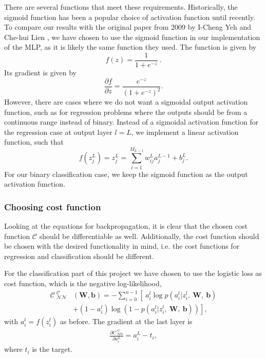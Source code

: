 \documentclass[a4paper, 11pt, twocolumn]{article}
\begin{document}
There are several functions that meet these requirements. Historically, the
sigmoid function has been a popular choice of activation function until recently.
To compare our results with the original paper from 2009 by I-Cheng Yeh and
Che-hui Lien \cite{origarticle}, we have chosen to use the sigmoid function in
our implementation of the MLP, as it is likely the same function they used. The
function is given by
\begin{equation}
	f(z) = \frac{1}{1+e^{-z}}\ .
\end{equation}
Its gradient is given by
\begin{equation}
	\label{eq:df/dz}
	\frac{\partial f}{\partial z} = \frac{e^{-z}}{(1+e^{-z})^2}.
\end{equation}
However, there are cases where we do not want a sigmoidal output activation
function, such as for regression problems where the outputs should be from a
continuous range instead of binary. Instead of a sigmoidal activation function
for the regression case at output layer $l=L$, we implement a linear activation
function, such that
\begin{equation}
f(z_j^L)=z_j^L= \sum_{i=1}^{M_{L-1}} w_{ij}^L a_j^{L-1} + b_j^L.
\end{equation}
For our binary classification case, we keep the sigmoid function as the output
activation function.
\subsubsection{Choosing cost function}
Looking at the equations for backpropagation, it is clear that the chosen cost
function $\mathcal{C}$ should be differentiable as well.
Additionally, the cost function should be chosen with the desired functionality 
in mind, i.e. the cost functions for regression and classification should be different.

For the classification part of this project we have chosen to use the logistic
loss as cost function, which is the negative log-likelihood,
\begin{align}
\mathcal{C_\text{ NN}^\text{ C}}&(\bm{W}, \bm{b}) = -\sum_{i=0}^{n-1}
\left[\  a_i^l\log p\left(a_i^l|z_i^l,\ \bm{ W,\ b} \right) \right.  \\
&   \left. + (1-a_i^l)\log \left(1-p(a_i^l|z_i^l,\ \bm{ W,\ b} )\right) \right],
\nonumber
\end{align}
with $a_i^l=f(z_i^l)$ as before. The gradient at the last layer is
\begin{align}
\frac{ \partial C_\text{ NN}^\text{ C}}  {\partial a_i^L} =
a_i^L-t_i, \label{eq:dC/da_NN^C}
\end{align}
where $t_i$ is the target.\\
\end{document}
